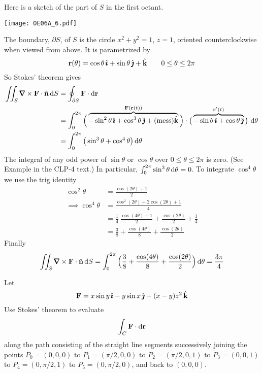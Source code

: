 \begin{solution}
Here is a sketch of the part of $S$ in the first octant.

\begin{center}
       \texttt{[image: OE06A\_6.pdf]}
\end{center}

The boundary, $\partial S$, of $S$ is the circle $x^2+y^2=1$, $z=1$, oriented counterclockwise when viewed from above. 
It is parametrized by
\begin{equation*}
\mathbf{r}(\theta) = \cos\theta\,\hat{\pmb{\imath}} + \sin\theta\,\hat{\pmb{\jmath}} + \hat{\mathbf{k}}
\qquad 0\le \theta\le 2\pi
\end{equation*}
So Stokes' theorem gives
\begin{align*}
\dblInt_S \vnabla\times\vF\cdot\hn\,\dee{S}
  & = \oint_{\partial S}\vF\cdot\dee{\vr} \\
  & = \int_0^{2\pi} \Big(\overbrace{
        -\sin^2\theta\,\hi +\cos^3\theta\,\hj+(\text{mess})\hk
               }^{\vF(\vr(t))}\Big)\cdot
   \big(\overbrace{-\sin\theta\,\hi+\cos\theta\,\hj}^{\vr'(t)}\big)\ 
     \dee{\theta}\\
  &=\int_0^{2\pi}\big(\sin^3\theta +\cos^4\theta\big)\,\dee{\theta} 
\end{align*}
The integral of any odd power of $\sin\theta$ or $\cos\theta$
over $0\le\theta\le 2\pi$ is zero. 
(See Example  in the CLP-4 text.)
In particular, $\int_0^{2\pi}\sin^3\theta\,\mathrm{d}\theta =0$.
To integrate $\cos^4\theta$ we use the trig identity
\begin{align*}
\cos^2\theta &= \frac{\cos(2\theta)+1}{2} \\
\implies
\cos^4\theta &= \frac{\cos^2(2\theta)+2\cos(2\theta) + 1}{4} \\
             &= \frac{1}{4}\ \frac{\cos(4\theta)+1}{2}
                +\frac{\cos(2\theta)}{2} +\frac{1}{4} \\
             &= \frac{3}{8} + \frac{\cos(4\theta)}{8} + \frac{\cos(2\theta)}{2}
\end{align*}
Finally
\begin{equation*}
\dblInt_S \vnabla\times\vF\cdot\hn\,\dee{S}
=\int_0^{2\pi}\Big( \frac{3}{8} + \frac{\cos(4\theta)}{8} 
             + \frac{\cos(2\theta)}{2}\Big)\,\dee{\theta} 
=\frac{3\pi}{4}
\end{equation*}
\end{solution}

\begin{question}[M317 2005D] %
Let
\begin{equation*}
\mathbf{F} = x \sin y\,\hat{\pmb{\imath}} - y \sin x\,\hat{\pmb{\jmath}} + (x - y)z^2\,\hat{\mathbf{k}}
\end{equation*}
Use Stokes' theorem to evaluate
\begin{equation*}
\int_C\mathbf{F}\cdot \mathrm{d}\mathbf{r}
\end{equation*}
along the path consisting of the straight line segments successively 
joining the points $P_0 = (0, 0, 0)$ to $P_1 = (\pi/2, 0, 0)$ to 
$P_2 = (\pi/2, 0, 1)$ to $P_3 = (0, 0, 1)$ to $P_4 = (0, \pi/2, 1)$ 
to $P_5 = (0, \pi/2, 0)$, and back to $(0, 0, 0)$.
\end{question}

